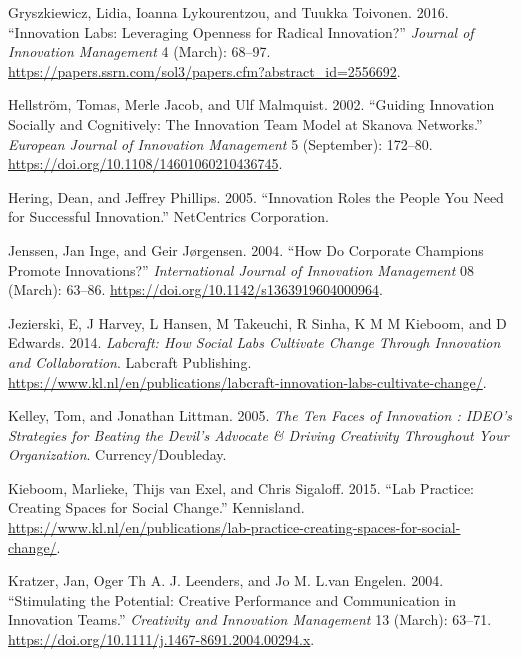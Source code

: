\documentclass[AMA,STIX1COL,APA,STIX2COL]{WileyNJD-v2}
\newlength{\cslhangindent}
\newenvironment{CSLReferences}[2] %
 {%
  \setlength{\parindent}{0pt}
  \ifodd #1 \everypar{\setlength{\hangindent}{\cslhangindent}}\ignorespaces\fi
  \ifnum #2 > 0
  \setlength{\parskip}{#2\baselineskip}
  \fi
 }%
 {}
\begin{document}
\begin{CSLReferences}{1}{0}
\leavevmode{}%
Gryszkiewicz, Lidia, Ioanna Lykourentzou, and Tuukka Toivonen. 2016.
{``Innovation Labs: Leveraging Openness for Radical Innovation?''}
\emph{Journal of Innovation Management} 4 (March): 68--97.
\url{https://papers.ssrn.com/sol3/papers.cfm?abstract_id=2556692}.

\leavevmode{}%
Hellström, Tomas, Merle Jacob, and Ulf Malmquist. 2002. {``Guiding
Innovation Socially and Cognitively: The Innovation Team Model at
Skanova Networks.''} \emph{European Journal of Innovation Management} 5
(September): 172--80. \url{https://doi.org/10.1108/14601060210436745}.

\leavevmode{}%
Hering, Dean, and Jeffrey Phillips. 2005. {``Innovation Roles the People
You Need for Successful Innovation.''} NetCentrics Corporation.

\leavevmode{}%
Jenssen, Jan Inge, and Geir Jørgensen. 2004. {``How Do Corporate
Champions Promote Innovations?''} \emph{International Journal of
Innovation Management} 08 (March): 63--86.
\url{https://doi.org/10.1142/s1363919604000964}.

\leavevmode{}%
Jezierski, E, J Harvey, L Hansen, M Takeuchi, R Sinha, K M M Kieboom,
and D Edwards. 2014. \emph{Labcraft: How Social Labs Cultivate Change
Through Innovation and Collaboration}. Labcraft Publishing.
\url{https://www.kl.nl/en/publications/labcraft-innovation-labs-cultivate-change/}.

\leavevmode{}%
Kelley, Tom, and Jonathan Littman. 2005. \emph{The Ten Faces of
Innovation : IDEO's Strategies for Beating the Devil's Advocate \&
Driving Creativity Throughout Your Organization}. Currency/Doubleday.

\leavevmode{}%
Kieboom, Marlieke, Thijs van Exel, and Chris Sigaloff. 2015. {``Lab
Practice: Creating Spaces for Social Change.''} Kennisland.
\url{https://www.kl.nl/en/publications/lab-practice-creating-spaces-for-social-change/}.

\leavevmode{}%
Kratzer, Jan, Oger Th A. J. Leenders, and Jo M. L.van Engelen. 2004.
{``Stimulating the Potential: Creative Performance and Communication in
Innovation Teams.''} \emph{Creativity and Innovation Management} 13
(March): 63--71. \url{https://doi.org/10.1111/j.1467-8691.2004.00294.x}.


\end{CSLReferences}
\end{document}
